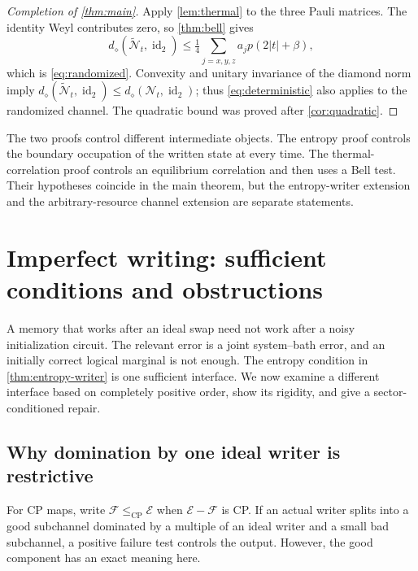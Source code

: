 \documentclass[11pt,reqno]{amsart}
\numberwithin{equation}{section}
\theoremstyle{definition}
\theoremstyle{remark}
\newcommand{\id}{\operatorname{id}}
\newcommand{\Ncal}{\mathcal N}
\newcommand{\diam}{d_\diamond}
\begin{document}
\begin{proof}[Completion of \cref{thm:main}]
Apply \cref{lem:thermal} to the three Pauli matrices. The identity
Weyl contributes zero, so \cref{thm:bell} gives
\[
 \diam(\widetilde{\Ncal}_t,\id_2)
       \le\tfrac14\sum_{j=x,y,z}a_jp(2|t|+\beta),
\]
which is \eqref{eq:randomized}. Convexity and unitary invariance of
the diamond norm imply
\(\diam(\widetilde{\Ncal}_t,\id_2)
 \le\diam(\Ncal_t,\id_2)\);
thus \eqref{eq:deterministic} also applies to the randomized channel.
The quadratic bound was proved after \cref{cor:quadratic}.
\end{proof}

The two proofs control different intermediate objects. The entropy proof
controls the boundary occupation of the written state at every time.
The thermal-correlation proof controls an equilibrium correlation and
then uses a Bell test. Their hypotheses coincide in the main theorem,
but the entropy-writer extension and the arbitrary-resource channel
extension are separate statements.

\section{Imperfect writing: sufficient conditions and obstructions}
\label{sec:writing}

A memory that works after an ideal swap need not work after a noisy
initialization circuit. The relevant error is a joint system--bath error,
and an initially correct logical marginal is not enough.
The entropy condition in \cref{thm:entropy-writer} is one sufficient
interface. We now examine a different interface based on completely
positive order, show its rigidity, and give a sector-conditioned repair.

\subsection{Why domination by one ideal writer is restrictive}

For CP maps, write \(\mathcal F\le_{\mathrm{CP}}\mathcal E\) when
\(\mathcal E-\mathcal F\) is CP. If an actual writer splits into a
good subchannel dominated by a multiple of an ideal writer and a
small bad subchannel, a positive failure test controls the output.
However, the good component has an exact meaning here.
\end{document}
